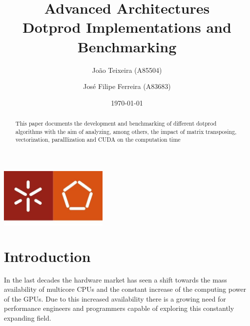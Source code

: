 \documentclass[a4paper]{report}
\begin{document}
\title{Advanced Architectures\\Dotprod Implementations and Benchmarking}
\author{João Teixeira (A85504) \and José Filipe Ferreira (A83683)}
\date{\today}

\begin{center}
    \begin{minipage}{0.75\linewidth}
        \centering
        \includegraphics[width=0.4\textwidth]{images/eng.jpeg}\par\vspace{1cm}
        \vspace{1.5cm}
        \href{https://www.uminho.pt/PT}
        {\color{black}{\scshape\LARGE Universidade do Minho}} \par
        \vspace{1cm}
        \href{https://www.di.uminho.pt/}
        {\color{black}{\scshape\Large Departamento de Informática}} \par
        \vspace{1.5cm}
        \maketitle
    \end{minipage}
\end{center}

\begin{abstract}
    \begin{center}
        This paper documents the development and benchmarking of different
        dotprod algorithms with the aim of analyzing, among others, the impact
        of matrix transposing, vectorization, paralllization and CUDA on the
        computation time
    \end{center}
\end{abstract}

\tableofcontents

\listoftables

\listoffigures

\chapter{Introduction}
In the last decades the hardware market has seen a shift towards the mass
availability of multicore CPUs and the constant increase of the computing power
of the GPUs. Due to this increased availability there is a growing need for
performance engineers and programmers capable of exploring this constantly
expanding field.
\end{document}
